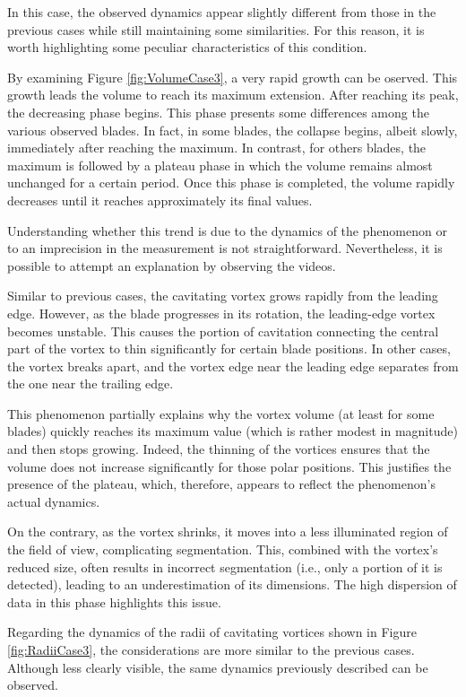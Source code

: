 \begin{itemize}
    In this case, the observed dynamics appear slightly different from those in the previous cases while still maintaining some similarities. For this reason, it is worth highlighting some peculiar characteristics of this condition.

    By examining Figure \ref{fig:VolumeCase3}, a very rapid growth can be oserved. This growth leads the volume to reach its maximum extension.  
    After reaching its peak, the decreasing phase begins. This phase presents some differences among the various observed blades. In fact, in some blades, the collapse begins, albeit slowly, immediately after reaching the maximum. In contrast, for others blades, the maximum is followed by a plateau phase in which the volume remains almost unchanged for a certain period.  
    Once this phase is completed, the volume rapidly decreases until it reaches approximately its final values.
    
    Understanding whether this trend is due to the dynamics of the phenomenon or to an imprecision in the measurement is not straightforward. Nevertheless, it is possible to attempt an explanation by observing the videos.

    Similar to previous cases, the cavitating vortex grows rapidly from the leading edge. However, as the blade progresses in its rotation, the leading-edge vortex becomes unstable. This causes the portion of cavitation connecting the central part of the vortex to thin significantly for certain blade positions.
    In other cases, the vortex breaks apart, and the vortex edge near the leading edge separates from the one near the trailing edge.

    This phenomenon partially explains why the vortex volume (at least for some blades) quickly reaches its maximum value (which is rather modest in magnitude) and then stops growing. 
    Indeed, the thinning of the vortices ensures that the volume does not increase significantly for those polar positions. This justifies the presence of the plateau, which, therefore, appears to reflect the phenomenon's actual dynamics.

    On the contrary, as the vortex shrinks, it moves into a less illuminated region of the field of view, complicating segmentation. This, combined with the vortex's reduced size, often results in incorrect segmentation (i.e., only a portion of it is detected), leading to an underestimation of its dimensions. The high dispersion of data in this phase highlights this issue.
    
    Regarding the dynamics of the radii of cavitating vortices shown in Figure \ref{fig:RadiiCase3}, the considerations are more similar to the previous cases. Although less clearly visible, the same dynamics previously described can be observed. 


\end{itemize}
